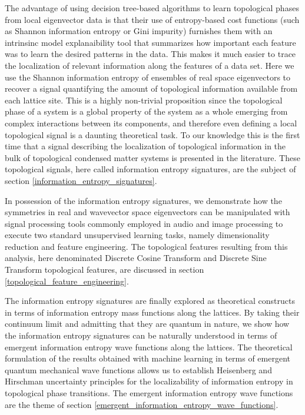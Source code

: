 \documentclass[10pt]{revtex4-1}
\begin{document}
The advantage of using decision tree-based algorithms to learn topological phases from local eigenvector data is that their use of entropy-based cost functions (such as Shannon information entropy or Gini impurity) furnishes them with an intrinsinc model explanaibility tool that summarizes how important each feature was to learn the desired patterns in the data. This makes it much easier to trace the localization of relevant information along the features of a data set. Here we use the Shannon information entropy of ensembles of real space eigenvectors to recover a signal quantifying the amount of topological information available from each lattice site. This is a highly non-trivial proposition since the topological phase of a system is a global property of the system as a whole emerging from complex interactions between its components, and therefore even defining a local topological signal is a daunting theoretical task. To our knowledge this is the first time that a signal describing the localization of topological information in the bulk of topological condensed matter systems is presented in the literature. These topological signals, here called information entropy signatures, are the subject of section \ref{information_entropy_signatures}. 

In possession of the information entropy signatures, we demonstrate how the symmetries in real and wavevector space eigenvectors can be manipulated with signal processing tools commonly employed in audio and image processing to execute two standard unsupervised learning tasks, namely dimensionality reduction and feature engineering. The topological features resulting from this analysis, here denominated Discrete Cosine Transform and Discrete Sine Transform topological features, are discussed in section \ref{topological_feature_engineering}.    

The information entropy signatures are finally explored as theoretical constructs in terms of information entropy mass functions along the lattices. By taking their continuum limit and admitting that they are quantum in nature, we show how the information entropy signatures can be naturally understood in terms of emergent information entropy wave functions along the lattices. The theoretical formulation of the results obtained with machine learning in terms of emergent quantum mechanical wave functions allows us to establish Heisenberg and Hirschman uncertainty principles for the localizability of information entropy in topological phase transitions. The emergent information entropy wave functions are the theme of section \ref{emergent_information_entropy_wave_functions}.      
\end{document}
